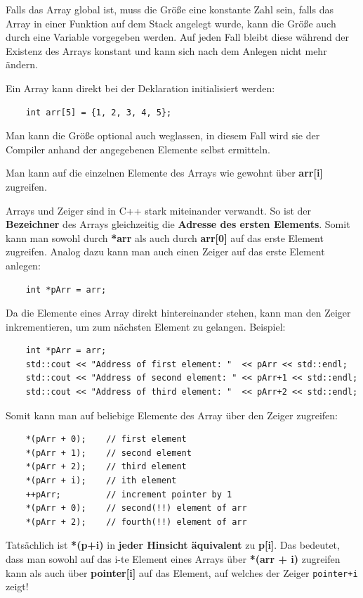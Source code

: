 Falls das Array global ist, muss die Größe eine konstante Zahl sein, falls das Array in einer Funktion auf dem Stack angelegt wurde, kann die Größe auch durch eine Variable vorgegeben werden.
Auf jeden Fall bleibt diese während der Existenz des Arrays konstant und kann sich nach dem Anlegen nicht mehr ändern.

Ein Array kann direkt bei der Deklaration initialisiert werden:

\begin{lstlisting}
	int arr[5] = {1, 2, 3, 4, 5};
\end{lstlisting}

Man kann die Größe optional auch weglassen, in diesem Fall wird sie der Compiler anhand der angegebenen Elemente selbst ermitteln.

Man kann auf die einzelnen Elemente des Arrays wie gewohnt über \textbf{arr[i]} zugreifen.

Arrays und Zeiger sind in C++ stark miteinander verwandt.
So ist der \textbf{Bezeichner} des Arrays gleichzeitig die \textbf{Adresse des ersten Elements}.
Somit kann man sowohl durch \textbf{*arr} als auch durch \textbf{arr[0]} auf das erste Element zugreifen.
Analog dazu kann man auch einen Zeiger auf das erste Element anlegen:

\begin{lstlisting}
	int *pArr = arr;
\end{lstlisting}

Da die Elemente eines Array direkt hintereinander stehen, kann man den Zeiger inkrementieren, um zum  nächsten Element zu gelangen.
Beispiel:

\begin{lstlisting}
	int *pArr = arr;
	std::cout << "Address of first element: "  << pArr << std::endl;
	std::cout << "Address of second element: " << pArr+1 << std::endl;
	std::cout << "Address of third element: "  << pArr+2 << std::endl;
\end{lstlisting}

Somit kann man auf beliebige Elemente des Array über den Zeiger zugreifen:

\begin{lstlisting}
	*(pArr + 0);	// first element
	*(pArr + 1);	// second element
	*(pArr + 2);	// third element
	*(pArr + i);	// ith element
	++pArr;			// increment pointer by 1
	*(pArr + 0);	// second(!!) element of arr
	*(pArr + 2);	// fourth(!!) element of arr
\end{lstlisting}

Tatsächlich ist \textbf{*(p+i)} in \textbf{jeder Hinsicht äquivalent} zu \textbf{p[i]}.
Das bedeutet, dass man sowohl auf das i-te Element eines Arrays über \textbf{*(arr + i)} zugreifen kann als auch über \textbf{pointer[i]} auf das Element, auf welches der Zeiger \texttt{pointer+i} zeigt!

